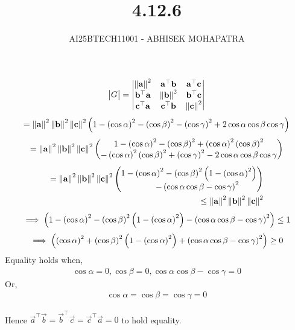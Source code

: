 \documentclass{beamer}
\title{4.12.6}
\author{AI25BTECH11001 - ABHISEK MOHAPATRA}
\begin{document}
{\let\newpage\relax\maketitle}
\renewcommand{\thefigure}{\theenumi}
\renewcommand{\thetable}{\theenumi}



	 \begin{align}
	 \begin{vmatrix}G\end{vmatrix} = \begin{vmatrix}\left\lVert\mathbf{a}\right\rVert^2 & \mathbf{a}^\top\mathbf{b}& \mathbf{a}^\top\mathbf{c} \\ \mathbf{b}^\top\mathbf{a}&\left\lVert\mathbf{b}\right\rVert^2 & \mathbf{b}^\top\mathbf{c}\\\mathbf{c}^\top\mathbf{a} &\mathbf{c}^\top\mathbf{b}&\left\lVert\mathbf{c}\right\rVert^2 \end{vmatrix}
\end{align}
	 \begin{align}
		= \left\lVert\mathbf{a}\right\rVert^2 \left\lVert\mathbf{b}\right\rVert^2 \left\lVert\mathbf{c}\right\rVert^2 \left( 1 - \left(\cos{\alpha}\right)^2- \left(\cos{\beta}\right)^2- \left(\cos{\gamma}\right)^2 + 2\cos{\alpha}\cos{\beta}\cos{\gamma}\right)
\end{align}
	 \begin{align}
			 = \left\lVert\mathbf{a}\right\rVert^2 \left\lVert\mathbf{b}\right\rVert^2 \left\lVert\mathbf{c}\right\rVert^2 \begin{pmatrix} 1 - \left(\cos{\alpha}\right)^2- \left(\cos{\beta}\right)^2 +\left(\cos{\alpha}\right)^2\left(\cos{\beta}\right)^2 
			 \\-\left(\cos{\alpha}\right)^2\left(\cos{\beta}\right)^2 + \left(\cos{\gamma}\right)^2 - 2\cos{\alpha}\cos{\beta}\cos{\gamma}\end{pmatrix}
	 \end{align}
	 \begin{align}
		= \left\lVert\mathbf{a}\right\rVert^2 \left\lVert\mathbf{b}\right\rVert^2 \left\lVert\mathbf{c}\right\rVert^2 \begin{pmatrix} 1 - \left(\cos{\alpha}\right)^2- \left(\cos{\beta}\right)^2\left(1 - \left(\cos{\alpha}\right)^2\right)\\ \quad\quad- \left(\cos{\alpha}\cos{\beta} - \cos{\gamma}\right)^2\end{pmatrix}
		\\ \leq \left\lVert\mathbf{a}\right\rVert^2 \left\lVert\mathbf{b}\right\rVert^2 \left\lVert\mathbf{c}\right\rVert^2
\end{align}
	 \begin{align}
		\implies \left( 1 - \left(\cos{\alpha}\right)^2- \left(\cos{\beta}\right)^2\left(1 - \left(\cos{\alpha}\right)^2\right)-\left(\cos{\alpha}\cos{\beta} - \cos{\gamma}\right)^2\right) \leq 1
\end{align}
	 \begin{align}
		\implies \left( \left(\cos{\alpha}\right)^2+ \left(\cos{\beta}\right)^2\left(1 - \left(\cos{\alpha}\right)^2\right)+\left(\cos{\alpha}\cos{\beta} - \cos{\gamma}\right)^2\right) \geq 0
\end{align}
		Equality holds when,
	 \begin{align}
\cos{\alpha} = 0, \cos{\beta} =0 , \cos{\alpha}\cos{\beta} - \cos{\gamma} = 0 
\end{align}
Or,
\begin{align}
\cos{\alpha} = \cos{\beta} = \cos{\gamma} = 0 
\end{align}

Hence $\vec{a}^\top\vec{b}=\vec{b}^\top\vec{c}=\vec{c}^\top\vec{a} = 0$ to hold equality.

		
\end{document}
